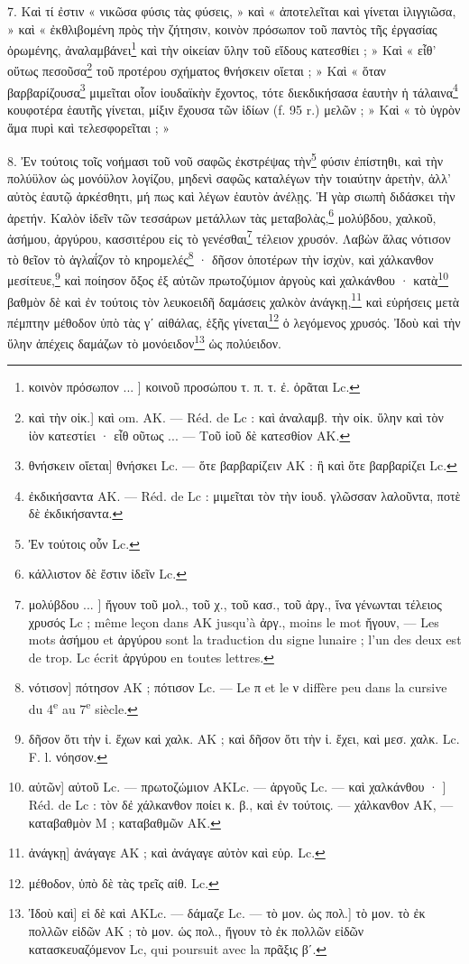\documentclass[landscape, a4paper, 11pt, oneside, polutonikogreek, french]{article}
\begin{document}
7. Καὶ τί ἐστιν « νικῶσα φύσις τὰς φύσεις, » καὶ « ἀποτελεῖται καὶ γίνεται ἰλιγγιῶσα, » καὶ « ἐκθλιβομένη πρὸς τὴν ζήτησιν, κοινὸν πρόσωπον τοῦ παντὸς τῆς ἐργασίας ὁρωμένης, ἀναλαμβάνει\footnote{κοινὸν πρόσωπον ... ] κοινοῦ προσώπου τ. π. τ. ἐ. ὁρᾶται Lc.} καὶ τὴν οἰκείαν ὕλην τοῦ εἴδους κατεσθίει ; » Καὶ « εἶθ' οὕτως πεσοῦσα\footnote{καὶ τὴν οἰκ.] καὶ om. AK. --- Réd. de Lc : καὶ ἀναλαμβ. τὴν οἰκ. ὕλην καὶ τὸν ἰὸν κατεστίει · εἶθ οῦτως ... --- Τοῦ ἰοῦ δὲ κατεσθίον AK.} τοῦ προτέρου σχήματος θνήσκειν οἴεται ; » Καὶ « ὅταν βαρβαρίζουσα\footnote{θνήσκειν οἴεται] θνήσκει Lc. --- ὅτε βαρβαρίζειν AK : ἣ καὶ ὅτε βαρβαρίζει Lc.} μιμεῖται οἷον ἰουδαϊκὴν ἔχοντος, τότε διεκδικήσασα ἑαυτὴν ἡ τάλαινα\footnote{ἐκδικήσαντα AK. --- Réd. de Lc : μιμεῖται τὸν τὴν ἰουδ. γλῶσσαν λαλοῦντα, ποτὲ δὲ ἐκδικήσαντα.} κουφοτέρα ἑαυτῆς γίνεται, μίξιν ἔχουσα τῶν ἰδίων (f. 95 r.) μελῶν ; » Καὶ « τὸ ὑγρὸν ἅμα πυρὶ καὶ τελεσφορεῖται ; »

8. Ἐν τούτοις τοῖς νοήμασι τοῦ νοῦ σαφῶς ἐκστρέψας τὴν\footnote{Ἐν τούτοις οὗν Lc.} φύσιν ἐπίστηθι, καὶ τὴν πολύϋλον ὡς μονόϋλον λογίζου, μηδενὶ σαφῶς καταλέγων τὴν τοιαύτην ἀρετὴν, ἀλλ' αὐτὸς ἑαυτῷ ἀρκέσθητι, μή πως καὶ λέγων ἑαυτὸν ἀνέλῃς. Ἡ γὰρ σιωπὴ διδάσκει τὴν ἀρετήν. Καλὸν ἰδεῖν τῶν τεσσάρων μετάλλων τὰς μεταβολὰς,\footnote{κάλλιστον δὲ ἔστιν ἰδεῖν Lc.} μολύβδου, χαλκοῦ, ἀσήμου, ἀργύρου, κασσιτέρου εἰς τὸ γενέσθαι\footnote{μολύβδου ... ] ἤγουν τοῦ μολ., τοῦ χ., τοῦ κασ., τοῦ ἀργ., ἵνα γένωνται τέλειος χρυσός Lc ; même leçon dans AK jusqu'à ἀργ., moins le mot ἤγουν, --- Les mots ἀσήμου et ἀργύρου sont la traduction du signe lunaire ; l'un des deux est de trop. Lc écrit ἀργύρου en toutes lettres.} τέλειον χρυσόν. Λαβὼν ἅλας νότισον τὸ θεῖον τὸ ἀγλαΐζον τὸ κηρομελές\footnote{νότισον] πότησον AK ; πότισον Lc. --- Le π et le ν diffère peu dans la cursive du 4\textsuperscript{e} au 7\textsuperscript{e} siècle.} · δῆσον ὁποτέρων τὴν ἰσχὺν, καὶ χάλκανθον μεσίτευε,\footnote{δῆσον ὅτι τὴν ἰ. ἔχων καὶ χαλκ. AK ; καὶ δῆσον ὅτι τὴν ἰ. ἔχει, καὶ μεσ. χαλκ. Lc. F. l. νόησον.} καὶ ποίησον ὄξος ἐξ αὐτῶν πρωτοζύμιον ἀργοὺς καὶ χαλκάνθου · κατὰ\footnote{αὐτῶν] αὐτοῦ Lc. --- πρωτοζώμιον AKLc. --- ἀργοῦς Lc. --- καὶ χαλκάνθου · ] Réd. de Lc : τὸν δἐ χάλκανθον ποίει κ. β., καὶ ἐν τούτοις. --- χάλκανθον AK, --- καταβαθμὸν M ; καταβαθμῶν AK.} βαθμὸν δὲ καὶ ἐν τούτοις τὸν λευκοειδῆ δαμάσεις χαλκὸν ἀνάγκῃ,\footnote{ἀνάγκῃ] ἀνάγαγε AK ; καὶ ἀνάγαγε αὐτὸν καὶ εὑρ. Lc.} καὶ εὑρήσεις μετὰ πέμπτην μέθοδον ὑπὸ τὰς γʹ αἰθάλας, ἑξῆς γίνεται\footnote{μέθοδον, ὑπὸ δὲ τὰς τρεῖς αἰθ. Lc.} ὁ λεγόμενος χρυσός. Ἰδοὺ καὶ τὴν ὕλην ἀπέχεις δαμάζων τὸ μονόειδον\footnote{Ἰδοὺ καὶ] εἰ δὲ καὶ AKLc. --- δάμαζε Lc. --- τὸ μον. ὡς πολ.] τὸ μον. τὸ ἐκ πολλῶν εἰδῶν AK ; τὸ μον. ὡς πολ., ἤγουν τὸ ἐκ πολλῶν εἰδῶν κατασκευαζόμενον Lc, qui poursuit avec la πρᾶξις βʹ.} ὡς πολύειδον.
\end{document}
